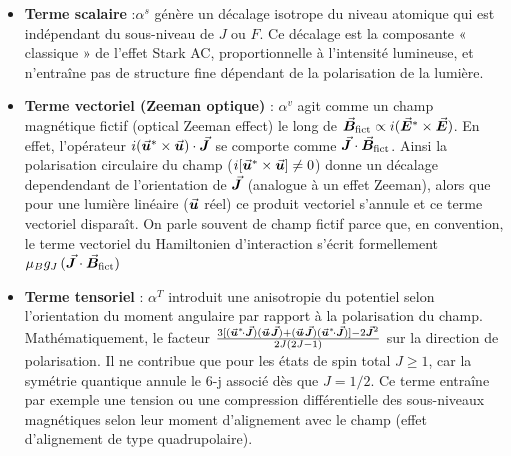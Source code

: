 \begin{itemize}[label = $\bullet$]
\item \textbf{Terme scalaire} :$\alpha^s$ génère un décalage isotrope du niveau atomique qui est indépendant du sous-niveau de $J$ ou $F$. Ce décalage est la composante « classique » de l’effet Stark AC, proportionnelle à l’intensité lumineuse, et n’entraîne pas de structure fine dépendant de la polarisation de la lumière.

\item \textbf{Terme vectoriel (Zeeman optique)} : %
$\alpha^v$ agit comme un champ magnétique fictif (optical Zeeman effect) le long de $\vec{{\bm{B}}}_{\rm fict}\propto i(\vec{{\bm{E}}}^\ast\times \vec{{\bm{E}}})$. En effet, l’opérateur $i(\vec{{\bm{u}}}^\ast\times\vec{{\bm{u}}})\cdot\vec{{\bm{J}}}$ se comporte comme $\vec{{\bm{J}}}\cdot \vec{{\bm{B}}}_{\rm fict}$. Ainsi la polarisation circulaire du champ ($i[\vec{{\bm{u}}}^\ast\times\vec{{\bm{u}}}]\neq 0$) donne un décalage dependendant de l’orientation de $\vec{{\bm{J}}}$ (analogue à un effet Zeeman), alors que pour une lumière linéaire ($\vec{{\bm{u}}}$ réel) ce produit vectoriel s’annule et ce terme vectoriel disparaît. On parle souvent de champ fictif parce que, en convention, le terme vectoriel du Hamiltonien d’interaction s’écrit formellement $\mu_B g_J\,(\vec{{\bm{J}}}\cdot\vec{{\bm{B}}}_{\rm fict})$

\item \textbf{Terme tensoriel} : %
	$\alpha^T$ introduit une anisotropie du potentiel selon l’orientation du moment angulaire par rapport à la polarisation du champ. Mathématiquement, le facteur $\frac{3[(\vec{{\bm{u}}}^*\!\cdot \vec{{\bm{J}}})(\vec{{\bm{u}}}\!\cdot\vec{{\bm{J}}})+(\vec{{\bm{u}}}\!\cdot\vec{{\bm{J}}})(\vec{{\bm{u}}}^*\!\cdot \vec{{\bm{J}}})]-2\vec{{\bm{J}}}^2}{2J(2J-1)}$ sur la direction de polarisation. Il ne contribue que pour les états de spin total $J\geq 1$, car la symétrie quantique annule le 6-j associé dès que $J=1/2$. Ce terme entraîne par exemple une tension ou une compression différentielle des sous-niveaux magnétiques selon leur moment d’alignement avec le champ (effet d’alignement de type quadrupolaire).
\end{itemize}

